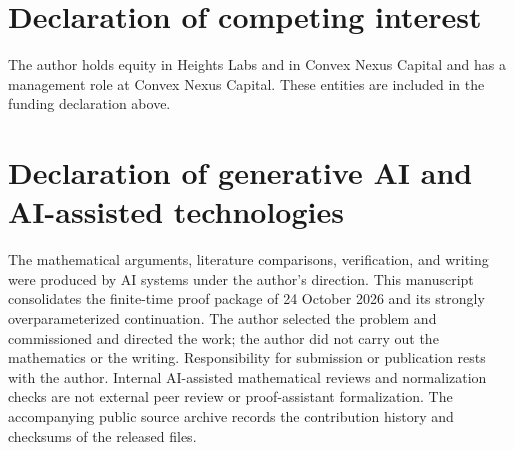 \documentclass[
  11pt,
  a4paper,
]{article}
\begin{document}
\section*{Declaration of competing interest}

The author holds equity in
Heights Labs and in Convex Nexus Capital and has a management role at
Convex Nexus Capital. These entities are included in the funding
declaration above.

\section*{Declaration of generative AI and AI-assisted technologies}

The mathematical arguments,
literature comparisons, verification, and writing were produced by AI
systems under the author's direction. This manuscript consolidates the
finite-time proof package of 24 October 2026 and its strongly
overparameterized continuation. The author selected the problem and
commissioned and directed the work; the author did not carry out the
mathematics or the writing. Responsibility for submission or publication
rests with the author. Internal AI-assisted mathematical reviews and
normalization checks are not external peer review or proof-assistant
formalization. The accompanying public source archive records the contribution history
and checksums of the released files.
\end{document}
